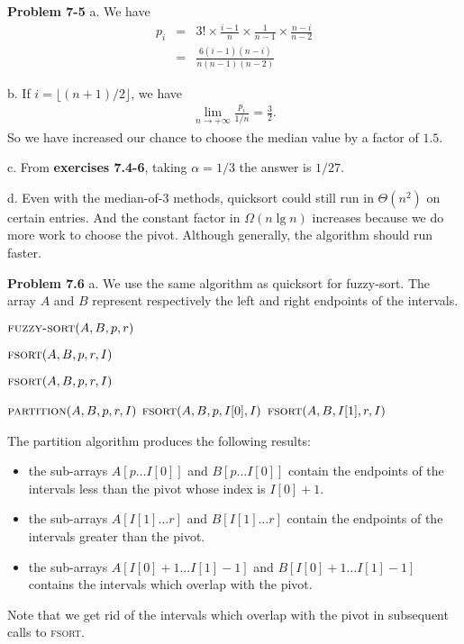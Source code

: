 \documentclass[a4paper,12pt]{article}
\newcommand{\newprob}[1]
{\bigskip \noindent \textbf{Problem #1} \newline}
\newcommand{\subpar}[1]{\medskip \noindent #1.}
\newcommand{\ra}{\rightarrow}
\begin{document}
\newprob{7-5}
\subpar{a} We have
\begin{eqnarray*}
  p_i &=& 3! \times \frac{i-1}{n} \times \frac{1}{n-1} \times
  \frac{n-i}{n-2} \\
  &=& \frac{6 (i-1)(n-i)}{n(n-1)(n-2)}
\end{eqnarray*}

\subpar{b} If $i = \lfloor (n+1)/2 \rfloor$, we have
\begin{eqnarray*}
  \lim_{n \ra +\infty}\frac{p_i}{1/n} = \frac{3}{2}.
\end{eqnarray*}
So we have increased our chance to choose the median value by a factor
of $1.5$.

\subpar{c} From \textbf{exercises 7.4-6}, taking $\alpha = 1/3$ the
answer is $1/27$.

\subpar{d} Even with the median-of-3 methods, quicksort could still run
in $\Theta(n^2)$ on certain entries.  And the constant factor in
$\Omega(n\lg n)$ increases because we do more work to choose the
pivot.  Although generally, the algorithm should run faster.

\newprob{7.6}
\subpar{a}  We use the same algorithm as quicksort for fuzzy-sort.
The array $A$ and $B$ represent respectively the left and right
endpoints of the intervals.

\medskip
\noindent
$\textsc{fuzzy-sort}(A, B, p, r)$
\begin{algorithmic}
  \STATE {}
  \STATE $\textsc{fsort}(A, B, p, r, I)$
\end{algorithmic}

\newpage
\noindent
$\textsc{fsort}(A, B, p, r, I)$
\begin{algorithmic}
  \STATE $\textsc{partition}(A, B, p, r, I)$
  \STATE $\textsc{fsort}(A, B, p, I[0], I)$
  \STATE $\textsc{fsort}(A, B, I[1], r, I)$
  \ENDIF
\end{algorithmic}

The partition algorithm produces the following results:

\begin{itemize}
\item the sub-arrays $A[p\ldots I[0]]$ and $B[p\ldots I[0]]$ contain
  the endpoints of the intervals less than the pivot whose index is
  $I[0]+1$.

  \item the sub-arrays $A[I[1] \ldots r]$ and $B[I[1]\ldots r]$
    contain the endpoints of the intervals greater than the pivot.

    \item the sub-arrays $A[I[0]+1 \ldots I[1]-1]$ and $B[I[0]+1\ldots
      I[1]-1]$ contains the intervals which overlap with the pivot.
\end{itemize}
Note that we get rid of the intervals which overlap with the pivot in
subsequent calls to \textsc{fsort}.
\end{document}
